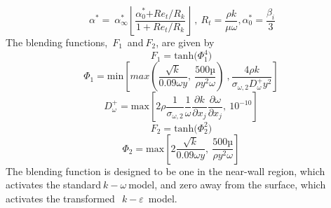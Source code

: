 \documentclass[Afour,sagev,times]{sagej}
\begin{document}
\begin{equation} \label{GrindEQ__8_} 
{\alpha }^{\mathrm{*}}\mathrm{=\ }{\alpha }^{\mathrm{*}}_{\mathrm{\infty }}\left\lfloor \frac{{\alpha }^{\mathrm{*}}_0\mathrm{+}{Re}_t\mathrm{/}R_k}{\mathrm{1+}{Re}_t\mathrm{/}R_k}\right\rfloor ~,{\mathrm{\ }R}_t\mathrm{=}\frac{\rho k}{\mu \omega }, {\alpha }^{\mathrm{*}}_0\mathrm{=}\frac{{\beta }_i}{\mathrm{3}} 
\end{equation} 
The blending functions,~$F_1$~and${\ F}_2$, are given by
\begin{equation} \label{GrindEQ__9_} 
F_{\mathrm{1}}\mathrm{=}{\mathrm{tanh} \mathrm{(}{\mathit{\Phi}}^{\mathrm{4}}_{\mathrm{1}}\mathrm{)}\ } 
\end{equation} 
\begin{equation} \label{GrindEQ__10_} 
{\mathit{\Phi}}_1={\mathrm{min} \left[{max \left(\frac{\sqrt{k}}{0.09\omega y},\ \frac{500\textrm{µ}}{\rho y^2\omega }\right)\ },\frac{4\rho k}{{\sigma }_{\omega ,2}D^+_{\omega }y^2}\right]\ } 
\end{equation} 
\begin{equation} \label{GrindEQ__11_} 
D^+_{\omega }={\mathrm{max} \left[2\rho \frac{1}{{\sigma }_{\omega ,2}}\frac{1}{\omega }\frac{\partial k}{\partial x_j}\frac{\partial \omega }{\partial x_j},\ {10}^{-10}\right]\ } 
\end{equation} 
\begin{equation} \label{GrindEQ__12_} 
F_{\mathrm{2}}\mathrm{=}{\mathrm{tanh} \mathrm{(}{\mathit{\Phi}}^{\mathrm{2}}_{\mathrm{2}}\mathrm{)}\ } 
\end{equation} 
\begin{equation} \label{GrindEQ__13_} 
{\mathit{\Phi}}_2={\mathrm{max} \left[2\frac{\sqrt{k}}{0.09\omega y},\ \frac{500\textrm{µ}}{\rho y^2\omega }\right]\ } 
\end{equation} 
The blending function is designed to be one in the near-wall region, which activates the standard$~k-\omega \ $model, and zero away from the surface, which activates the transformed~$~k-\varepsilon $~model.
\end{document}
